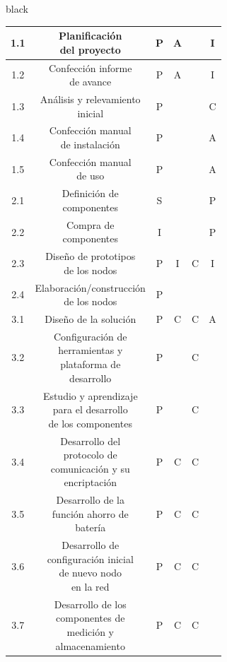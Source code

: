 \documentclass[11pt]{charter}
\begin{document}
\begin{consigna}{black}
\begin{table}[htpb]
{\begin{tabular}{|c|c|c|c|c|c|}
1.1 & \makecell{Planificación \\ del proyecto}  & P  & A &  & I \\ \hline
1.2 & \makecell{Confección informe \\ de avance} & P & A &  & I \\ \hline
1.3 & \makecell{Análisis y relevamiento \\ inicial} & P &  &  & C \\ \hline
1.4 & \makecell{Confección manual \\ de instalación} & P &  &  & A \\ \hline
1.5 & \makecell{Confección manual \\ de uso} & P &  &  & A \\ \hline
2.1 & \makecell{Definición de \\ componentes} & S &  &  & P\\ \hline
2.2 & \makecell{Compra de \\componentes} & I &  &  & P \\ \hline
2.3 & \makecell{Diseño de prototipos \\ de los nodos} & P & I & C & I\\ \hline 
2.4 & \makecell{Elaboración/construcción \\ de los nodos} & P &  &  & \\ \hline
3.1 & Diseño de la solución & P & C & C & A\\ \hline
3.2 & \makecell{Configuración de  \\ herramientas y  \\ plataforma de\\ desarrollo}  & P &  & C & \\ \hline

3.3 & \makecell{Estudio y aprendizaje \\ para el desarrollo  \\ de los componentes} & P &  & C & \\ \hline
3.4 & \makecell{Desarrollo del \\ protocolo de \\ comunicación y su\\ encriptación} & P & C & C & \\ \hline
3.5 & \makecell{Desarrollo de la \\ función ahorro de \\ batería} & P & C  & C & \\ \hline
3.6 & \makecell{Desarrollo de \\configuración inicial\\ de nuevo nodo \\ en la red} & P & C & C & \\ \hline
3.7 & \makecell{Desarrollo de los \\ componentes de \\  medición y \\ almacenamiento} & P & C & C & \\ \hline


\end{tabular}}
\end{table}
\end{consigna}
\end{document}
